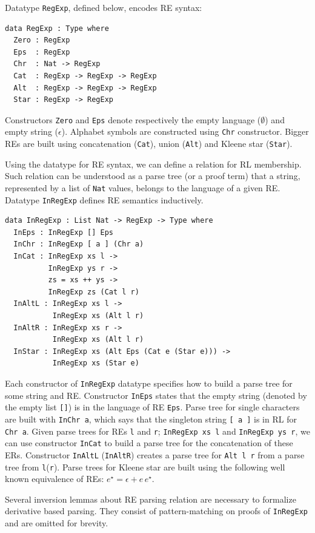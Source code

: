 \documentclass{llncs}
\newcommand{\idris}[1]{\texttt{#1}}%
\begin{document}
Datatype \idris{RegExp}, defined below, encodes RE syntax:
\begin{verbatim}
data RegExp : Type where
  Zero : RegExp
  Eps  : RegExp
  Chr  : Nat -> RegExp
  Cat  : RegExp -> RegExp -> RegExp
  Alt  : RegExp -> RegExp -> RegExp
  Star : RegExp -> RegExp
\end{verbatim}
Constructors \idris{Zero} and \idris{Eps} denote respectively the
empty language ($\emptyset$) and empty string ($\epsilon$). Alphabet
symbols are constructed using \idris{Chr} constructor. Bigger REs are
built using concatenation (\idris{Cat}), union (\idris{Alt}) and
Kleene star (\idris{Star}).

Using the datatype for RE syntax, we can define a relation for RL
membership. Such relation can be understood as a parse tree (or a
proof term) that a string, represented by a list of \idris{Nat}
values, belongs to the language of a given
RE. Datatype \idris{InRegExp} defines RE semantics inductively.

\begin{verbatim}
data InRegExp : List Nat -> RegExp -> Type where
  InEps : InRegExp [] Eps
  InChr : InRegExp [ a ] (Chr a)
  InCat : InRegExp xs l ->
          InRegExp ys r ->
          zs = xs ++ ys ->
          InRegExp zs (Cat l r)
  InAltL : InRegExp xs l ->
           InRegExp xs (Alt l r)
  InAltR : InRegExp xs r ->
           InRegExp xs (Alt l r)
  InStar : InRegExp xs (Alt Eps (Cat e (Star e))) ->
           InRegExp xs (Star e)
\end{verbatim}

Each constructor of \idris{InRegExp} datatype specifies how to build a
parse tree for some string and RE. Constructor \idris{InEps} states
that the empty string (denoted by the empty list \idris{[]}) is in the
language of RE \idris{Eps}. Parse tree for single characters are built
with \idris{InChr a}, which says that the singleton string
\idris{[ a ]} is in RL for \idris{Chr a}. Given parse trees for REs
\idris{l} and \idris{r}; \idris{InRegExp xs l} and \idris{InRegExp ys
  r}, we can use constructor \idris{InCat} to build a parse tree for the
concatenation of these ERs. Constructor \idris{InAltL}
(\idris{InAltR}) creates a parse tree for \idris{Alt l r} from a parse
tree from \idris{l}(\idris{r}). Parse trees for Kleene star are built
using the following well known equivalence of REs: $e^\star = \epsilon
+ e\,e^\star$.

Several inversion lemmas about RE parsing relation are necessary to
formalize derivative based parsing. They consist of pattern-matching
on proofs of \idris{InRegExp} and are omitted for brevity.
\end{document}
